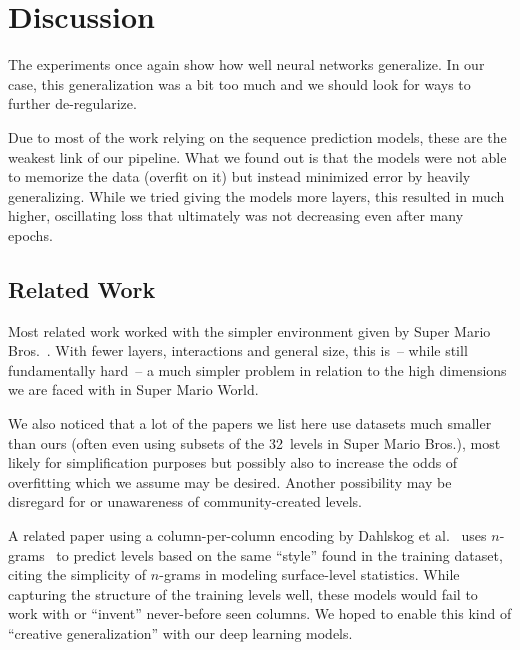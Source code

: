 \section{Discussion}

The experiments once again show how well neural networks generalize.
In our case, this generalization was a bit too much and we should look
for ways to further de-regularize.

Due to most of the work relying on the sequence prediction models,
these are the weakest link of our pipeline. What we found out is that
the models were not able to memorize the data (overfit on it) but
instead minimized error by heavily generalizing. While we tried giving
the models more layers, this resulted in much higher, oscillating loss
that ultimately was not decreasing even after many epochs.

\subsection{Related Work}

Most related work worked with the simpler environment given by Super
Mario Bros.~\cite{SuperMarioBros2019}. With fewer layers,
interactions and general size, this is~-- while still fundamentally
hard~-- a much simpler problem in relation to the high dimensions we
are faced with in Super Mario World.

We also noticed that a lot of the papers we list here use datasets
much smaller than ours (often even using subsets of the 32~levels in
Super Mario Bros.), most likely for simplification purposes but
possibly also to increase the odds of overfitting which we assume may
be desired. Another possibility may be disregard for or unawareness of
community-created levels.

A related paper using a column-per-column encoding by Dahlskog et
al.~\cite{dahlskogLinearLevelsNgrams2014} uses $n$-grams~%
to predict levels based on the same ``style'' found in the training
dataset, citing the simplicity of $n$-grams in modeling surface-level
statistics. While capturing the structure of the training levels well,
these models would fail to work with or ``invent'' never-before seen
columns. We hoped to enable this kind of ``creative generalization''
with our deep learning models.

